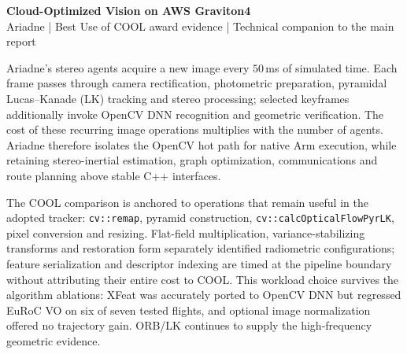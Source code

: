 \documentclass[11pt,a4paper]{article}
\newcommand{\subhead}[1]{\Needspace{5\baselineskip}\vspace{0.5em}\noindent{\bfseries #1}\par\vspace{-0.1em}}
\begin{document}
\begin{center}
{\Large\bfseries Cloud-Optimized Vision on AWS Graviton4}\\[3pt]
{\small Ariadne | Best Use of COOL award evidence | Technical companion to the main report}
\end{center}
\vspace{-0.6em}

\subhead{The workload that repeats}
Ariadne's stereo agents acquire a new image every $50$\,ms of simulated time. Each frame passes through camera rectification, photometric preparation, pyramidal Lucas--Kanade (LK) tracking and stereo processing; selected keyframes additionally invoke OpenCV DNN recognition and geometric verification. The cost of these recurring image operations multiplies with the number of agents. Ariadne therefore isolates the OpenCV hot path for native Arm execution, while retaining stereo-inertial estimation, graph optimization, communications and route planning above stable C++ interfaces.

The COOL comparison is anchored to operations that remain useful in the adopted tracker: \texttt{cv::remap}, pyramid construction, \texttt{cv::calcOpticalFlowPyrLK}, pixel conversion and resizing. Flat-field multiplication, variance-stabilizing transforms and restoration form separately identified radiometric configurations; feature serialization and descriptor indexing are timed at the pipeline boundary without attributing their entire cost to COOL. This workload choice survives the algorithm ablations: XFeat was accurately ported to OpenCV DNN but regressed EuRoC VO on six of seven tested flights, and optional image normalization offered no trajectory gain. ORB/LK continues to supply the high-frequency geometric evidence.

\begin{center}
\end{center}
\end{document}
